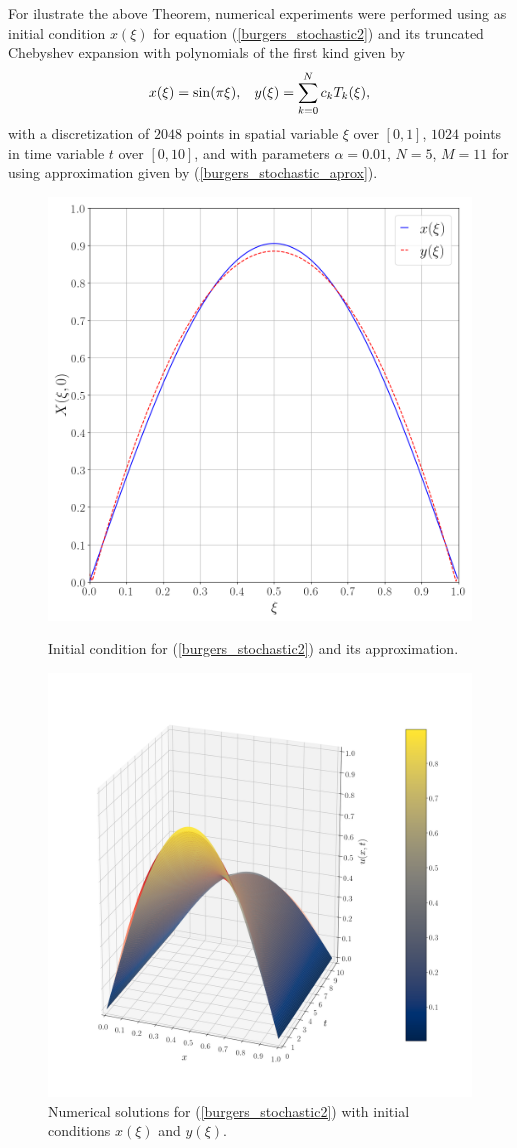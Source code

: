 	\noindent For ilustrate the above Theorem, numerical experiments were performed using as initial condition $x(\xi)$ for equation (\ref{burgers_stochastic2}) and its truncated Chebyshev expansion with polynomials of the first kind given by
	\begin{align*}
		x(\xi) = \sin(\pi \xi), \hspace{3mm} y(\xi) = \displaystyle \sum^{N}_{k=0} c_k T_k (\xi),
	\end{align*}
	with a discretization of $2048$ points in spatial variable $\xi$ over $[0, 1]$, $1024$ points in time variable $t$ over $[0, 10]$, and with parameters $\alpha = 0.01$, $N = 5$, $M = 11$ for using approximation given by (\ref{burgers_stochastic_aprox}).
	
	\begin{figure}[H]
		\centering	
		\includegraphics[width=.55\textwidth]{Figures/IC.png}
		\caption{Initial condition for (\ref{burgers_stochastic2}) and its approximation.}
		\includegraphics[width=.9\textwidth]{Figures/Numerical_Solution_Stochastic.png}
		\caption{Numerical solutions for (\ref{burgers_stochastic2}) with initial conditions $x(\xi)$ and $y(\xi)$.}
	\end{figure}
	
